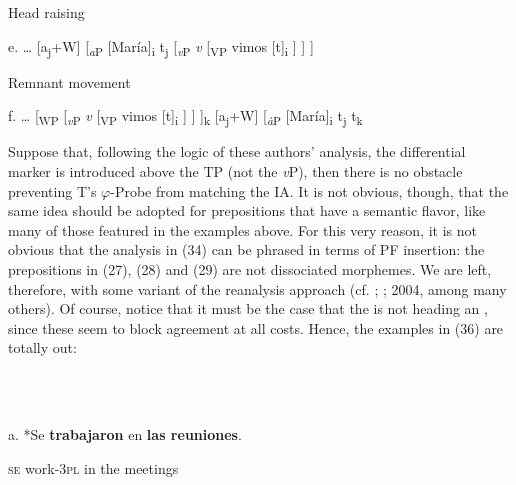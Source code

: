 \documentclass[output=paper]{langsci/langscibook}
\begin{document}
  Head raising 

e.  …  [a\textsubscript{j}+W] [\textit{\textsubscript{a}}\textsubscript{P} [María]\textsubscript{i}  t\textsubscript{j}  [\textit{\textsubscript{v}}\textsubscript{P}  \textit{v}  [\textsubscript{VP} vimos [t]\textsubscript{i} ] ] ]  

  Remnant movement 

f.  …  [\textsubscript{WP}  [\textit{\textsubscript{v}}\textsubscript{P}  \textit{v}  [\textsubscript{VP} vimos [t]\textsubscript{i} ] ] ]\textsubscript{k} [a\textsubscript{j}+W] [\textit{\textsubscript{à}}\textsubscript{P} [María]\textsubscript{i}  t\textsubscript{j}  t\textsubscript{k}  

\begin{styleHTMLPreformatted}
Suppose that, following the logic of these authors’ analysis, the differential marker is introduced above the TP (not the \textit{v}P), then there is no obstacle preventing T’s $\varphi ${}-Probe from matching the IA. It is not obvious, though, that the same idea should be adopted for prepositions that have a semantic flavor, like many of those featured in the examples above. For this very reason, it is not obvious that the analysis in (34) can be phrased in terms of PF insertion: the prepositions in (27), (28) and (29) are not dissociated morphemes. We are left, therefore, with some variant of the reanalysis approach (cf. \citet{Hornstein1981}; \citealt{Kayne1975}; 2004, among many others). Of course, notice that it must be the case that the  is not heading an , since these seem to block agreement at all costs. Hence, the examples in (36) are totally out:
\end{styleHTMLPreformatted}

\begin{styleHTMLPreformatted}
\ea%
    \label{ex:key:36}
    \gll\\
        \\
    \glt
    \z

\end{styleHTMLPreformatted}

\begin{styleHTMLPreformatted}
a. *Se  \textbf{trabajaron}  en  \textbf{las reuniones}.   
\end{styleHTMLPreformatted}

\begin{styleHTMLPreformatted}
        \textsc{se}   work-\textsc{3pl}     in  the meetings
\end{styleHTMLPreformatted}
\end{document}
